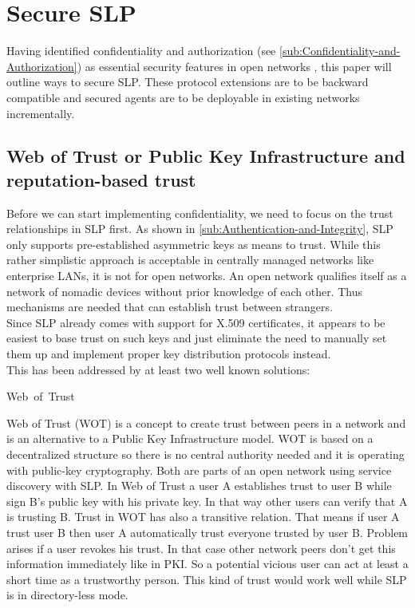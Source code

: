 \section{Secure SLP\label{sec:Secure-SLP}}
Having identified confidentiality and authorization (see \ref{sub:Confidentiality-and-Authorization}) as essential security features in open networks \citep{Cotroneo2004, Hollick2001}, this paper will outline ways to secure SLP. These protocol extensions are to be backward compatible and secured agents are to be deployable in existing networks incrementally.

\subsection{Web of Trust or Public Key Infrastructure and reputation-based trust}
Before we can start implementing confidentiality, we need to focus on the trust relationships in SLP first. As shown in \ref{sub:Authentication-and-Integrity}, SLP only supports pre-established asymmetric keys as means to trust. While this rather simplistic approach is acceptable in centrally managed networks like enterprise LANs, it is not for open networks. An open network qualifies itself as a network of nomadic devices without prior knowledge of each other. Thus mechanisms are needed that can establish trust between strangers.\\
Since SLP already comes with support for X.509 certificates, it appears to be easiest to base trust on such keys and just eliminate the need to manually set them up and implement proper key distribution protocols instead.\\
This has been addressed by at least two well known solutions:
\begin{description}
\item [Web~of~Trust]
\end{description}
Web of Trust (WOT) is a concept to create trust between peers in a network and is an alternative to a Public Key Infrastructure model. WOT is based on a decentralized structure so there is no central authority needed and it is operating with public-key cryptography. Both are parts of an open network using service discovery with SLP. In Web of Trust a user A establishes trust to user B while sign B's public key with his private key. In that way other users can verify that A is trusting B. Trust in WOT has also a transitive relation. That means if user A trust user B then user A automatically trust everyone trusted by user B. Problem arises if a user revokes his trust. In that case other network peers don't get this information immediately like in PKI. So a potential vicious user can act at least a short time as a trustworthy person. This kind of trust would work well while SLP is in directory-less mode. 
